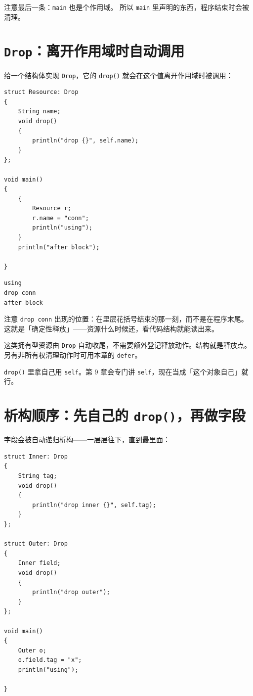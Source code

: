 注意最后一条：\texttt{main} 也是个作用域。 所以 \texttt{main} 里声明的东西，程序结束时会被清理。

\section{\texttt{Drop}：离开作用域时自动调用}

给一个结构体实现 \texttt{Drop}，它的 \texttt{drop(\allowbreak{})\allowbreak{}} 就会在这个值离开作用域时被调用：

\par
\medskip
\begin{lstlisting}[style=chali]
struct Resource: Drop
{
    String name;
    void drop()
    {
        println("drop {}", self.name);
    }
};

void main()
{
    {
        Resource r;
        r.name = "conn";
        println("using");
    }
    println("after block");

}
\end{lstlisting}
\par
\medskip

\par
\medskip
\begin{lstlisting}[style=out]
using
drop conn
after block
\end{lstlisting}
\par
\medskip

注意 \texttt{drop conn} 出现的位置：在里层花括号结束的那一刻，而不是在程序末尾。这就是「确定性释放」——资源什么时候还，看代码结构就能读出来。

这类拥有型资源由 \texttt{Drop} 自动收尾，不需要额外登记释放动作。结构就是释放点。 另有非所有权清理动作时可用本章的 \texttt{defer}。

\texttt{drop(\allowbreak{})\allowbreak{}} 里拿自己用 \texttt{self}。第 9 章会专门讲 \texttt{self}，现在当成「这个对象自己」就行。

\section{析构顺序：先自己的 \texttt{drop(\allowbreak{})\allowbreak{}}，再做字段}

字段会被自动递归析构——一层层往下，直到最里面：

\par
\medskip
\begin{lstlisting}[style=chali]
struct Inner: Drop
{
    String tag;
    void drop()
    {
        println("drop inner {}", self.tag);
    }
};

struct Outer: Drop
{
    Inner field;
    void drop()
    {
        println("drop outer");
    }
};

void main()
{
    Outer o;
    o.field.tag = "x";
    println("using");

}
\end{lstlisting}
\par
\medskip

